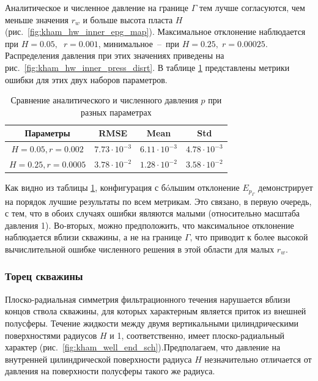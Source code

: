 \documentclass{article}
\begin{document}
Аналитическое и численное давление на границе $\Gamma$ тем лучше согласуются, чем меньше значения $r_w$ и больше высота пласта $H$ (рис.~\ref{fig:kham_hw_inner_epg_map}). Максимальное отклонение наблюдается при $H = 0.05,\;\; r = 0.001$, минимальное~--~при $H = 0.25, \; r = 0.00025$. Распределения давления при этих значениях приведены на рис.~\ref{fig:kham_hw_inner_press_disrt}.
В таблице \ref{tab:kham_hw_inner_p_error_metrics} представлены метрики ошибки для этих двух наборов параметров.

\begin{table}[h!]
\centering
\caption{Сравнение аналитического и численного давления $p$ при разных параметрах}
\label{tab:kham_hw_inner_p_error_metrics}
\begin{tabular}{|c|c|c|c|}
\hline
\textbf{Параметры} & \textbf{RMSE} & \textbf{Mean} & \textbf{Std} \\
\hline
$H=0.05, r=0.002$ & $7.73 \cdot 10^{-3}$ & $6.11 \cdot 10^{-3}$ & $4.78 \cdot 10^{-3}$ \\
\hline
$H=0.25, r=0.0005$ & $3.78 \cdot 10^{-2}$ & $1.28 \cdot 10^{-2}$ & $3.58 \cdot 10^{-2}$ \\
\hline
\end{tabular}
\end{table}

Как видно из таблицы \ref{tab:kham_hw_inner_p_error_metrics}, конфигурация  с б\'{o}льшим отклонение $E_{p_{\Gamma}}$ демонстрирует на порядок лучшие результаты по всем метрикам. Это связано, в первую очередь, с тем, что в обоих случаях ошибки являются малыми (относительно масштаба давления 1). Во-вторых, можно предположить, что максимальное отклонение наблюдается вблизи скважины, а не на границе $\Gamma$, что приводит к более высокой вычислительной ошибке численного решения в этой области для малых $r_w$.

\subsubsection{Торец скважины}

Плоско-радиальная симметрия фильтрационного течения нарушается вблизи концов ствола скважины, для которых характерным является приток из внешней полусферы. Течение жидкости между двумя вертикальными цилиндрическими поверхностями радиусов $H$ и 1, соответственно, имеет плоско-радиальный характер (рис.~\ref{fig:kham_well_end_sch}).Предполагаем, что давление на внутренней цилиндрической поверхности радиуса $H$ незначительно отличается от давления на поверхности полусферы такого же радиуса.
\end{document}
